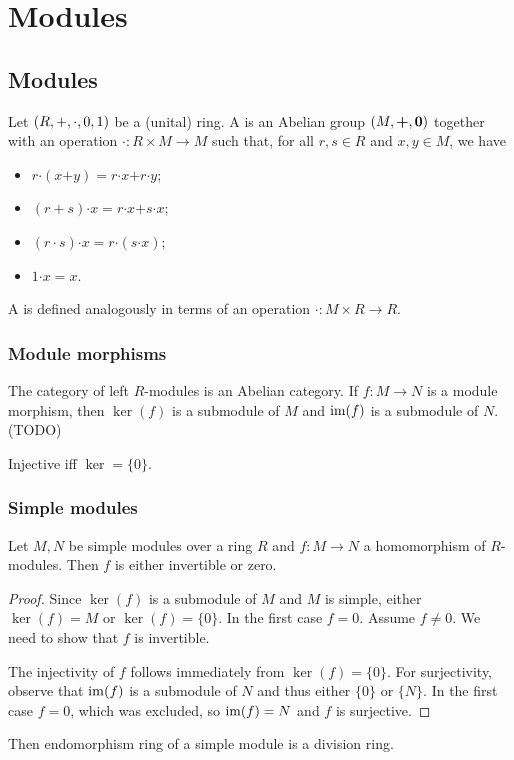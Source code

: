 \chapter{Modules}
\section{Modules}
\begin{definition}
Let $\sSet{R, +, \cdot, 0,1}$ be a (unital) ring. A  is an Abelian group $\sSet{M, \boldsymbol{+}, \vec{0}}$ together with an operation $\boldsymbol{\cdot}: R\times M \to M$ such that, for all $r,s\in R$ and $x,y \in M$, we have
\begin{itemize}
\item $r \boldsymbol{\cdot} (x\boldsymbol{+}y) = r\boldsymbol{\cdot}x \boldsymbol{+} r\boldsymbol{\cdot} y$;
\item $(r+s)\boldsymbol{\cdot} x = r\boldsymbol{\cdot}x \boldsymbol{+} s\boldsymbol{\cdot} x$;
\item $(r\cdot s)\boldsymbol{\cdot}x = r\boldsymbol{\cdot}(s\boldsymbol{\cdot}x)$;
\item $1\boldsymbol{\cdot}x = x$.
\end{itemize}
A  is defined analogously in terms of an operation $\boldsymbol{\cdot}: M\times R \to R$.
\end{definition}

\subsection{Module morphisms}
The category of left $R$-modules is an Abelian category. If $f: M\to N$ is a module morphism, then $\ker(f)$ is a submodule of $M$ and $\operatorname{im}(f)$ is a submodule of $N$. (TODO)

\begin{lemma}
Injective iff $\ker = \{0\}$. 
\end{lemma}

\subsection{Simple modules}

\begin{theorem} \label{SchursLemma}
Let $M,N$ be simple modules over a ring $R$ and $f:M\to N$ a homomorphism of $R$-modules. Then $f$ is either invertible or zero.
\end{theorem}
\begin{proof}
Since $\ker(f)$ is a submodule of $M$ and $M$ is simple, either $\ker(f) = M$ or $\ker(f) = \{0\}$. In the first case $f = 0$. Assume $f\neq 0$. We need to show that $f$ is invertible.

The injectivity of $f$ follows immediately from $\ker(f) = \{0\}$. For surjectivity, observe that $\operatorname{im}(f)$ is a submodule of $N$ and thus either $\{0\}$ or $\{N\}$. In the first case $f = 0$, which was excluded, so $\operatorname{im}(f) = N$ and $f$ is surjective.
\end{proof}
\begin{corollary}
Then endomorphism ring of a simple module is a division ring.
\end{corollary}


